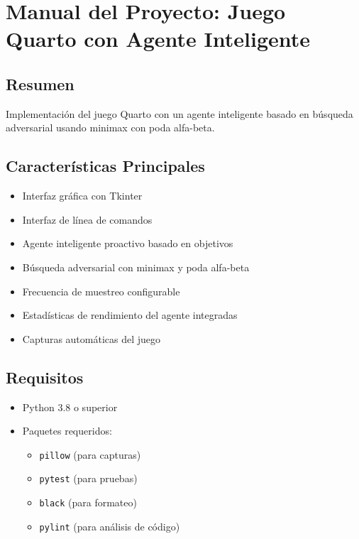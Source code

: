 \documentclass[conference]{IEEEtran}
\begin{document}
\section{Manual del Proyecto: Juego Quarto con Agente Inteligente}

\subsection{Resumen}
Implementación del juego Quarto con un agente inteligente basado en búsqueda adversarial usando minimax con poda alfa-beta.

\subsection{Características Principales}
\begin{itemize}
	\item Interfaz gráfica con Tkinter
	\item Interfaz de línea de comandos
	\item Agente inteligente proactivo basado en objetivos
	\item Búsqueda adversarial con minimax y poda alfa-beta
	\item Frecuencia de muestreo configurable
	\item Estadísticas de rendimiento del agente integradas
	\item Capturas automáticas del juego
\end{itemize}

\subsection{Requisitos}
\begin{itemize}
	\item Python 3.8 o superior
	\item Paquetes requeridos:
	\begin{itemize}
		\item \texttt{pillow} (para capturas)
		\item \texttt{pytest} (para pruebas)
		\item \texttt{black} (para formateo)
		\item \texttt{pylint} (para análisis de código)
	\end{itemize}
\end{itemize}
\end{document}
